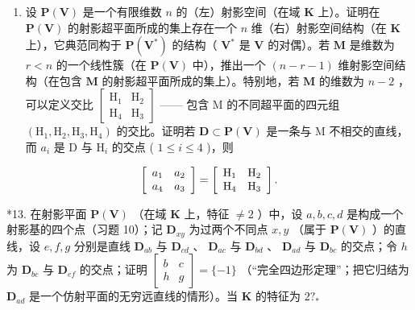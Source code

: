 \begin{enumerate}
\def\labelenumi{\arabic{enumi}.}
\setcounter{enumi}{11}
\tightlist
\item
  设 \(\mathbf{P}(\mathbf{V})\) 是一个有限维数 \(n\) 的（左）射影空间（在域 \(\mathbf{K}\) 上）。证明在 \(\mathbf{P}(\mathbf{V})\) 的射影超平面所成的集上存在一个 \(n\) 维（右）射影空间结构（在 \(\mathbf{K}\) 上），它典范同构于 \(\mathbf{P}(\mathbf{V}^*)\) 的结构（ \(\mathbf{V}^*\) 是 \(\mathbf{V}\) 的对偶）。若 \(\mathbf{M}\) 是维数为 \(r < n\) 的一个线性簇（在 \(\mathbf{P}(\mathbf{V})\) 中），推出一个 \((n - r - 1)\) 维射影空间结构（在包含 \(\mathbf{M}\) 的射影超平面所成的集上）。特别地，若 \(\mathbf{M}\) 的维数为 \(n - 2\) ，可以定义交比 \(\begin{bmatrix} \mathrm{H}_1 & \mathrm{H}_2 \\ \mathrm{H}_4 & \mathrm{H}_3 \end{bmatrix}\) —— 包含 M 的不同超平面的四元组 \((\mathrm{H}_1, \mathrm{H}_2, \mathrm{H}_3, \mathrm{H}_4)\) 的交比。证明若 \(\mathbf{D} \subset \mathbf{P}(\mathbf{V})\) 是一条与 M 不相交的直线，而 \(a_i\) 是 D 与 \(\mathrm{H}_i\) 的交点 ( \(1 \leqslant i \leqslant 4\) )，则
\end{enumerate}

\[
\left[ \begin{array}{c c} a _ {1} & a _ {2} \\ a _ {4} & a _ {3} \end{array} \right] = \left[ \begin{array}{c c} \mathrm{H} _ {1} & \mathrm{H} _ {2} \\ \mathrm{H} _ {4} & \mathrm{H} _ {3} \end{array} \right].
\]

*13. 在射影平面 \(\mathbf{P}(\mathbf{V})\) （在域 \(\mathbf{K}\) 上，特征 \(\neq 2\) ）中，设 \(a, b, c, d\) 是构成一个射影基的四个点（习题 10）；记 \(\mathbf{D}_{xy}\) 为过两个不同点 \(x, y\) （属于 \(\mathbf{P}(\mathbf{V})\) ）的直线，设 \(e, f, g\) 分别是直线 \(\mathbf{D}_{ab}\) 与 \(\mathbf{D}_{cd}\) 、 \(\mathbf{D}_{ac}\) 与 \(\mathbf{D}_{bd}\) 、 \(\mathbf{D}_{ad}\) 与 \(\mathbf{D}_{bc}\) 的交点；令 \(h\) 为 \(\mathbf{D}_{bc}\) 与 \(\mathbf{D}_{ef}\) 的交点；证明 \(\begin{bmatrix} b & c \\ h & g \end{bmatrix} = \{-1\}\) （“完全四边形定理”；把它归结为 \(\mathbf{D}_{ad}\) 是一个仿射平面的无穷远直线的情形）。当 \(\mathbf{K}\) 的特征为 \(2?_{*}\)


